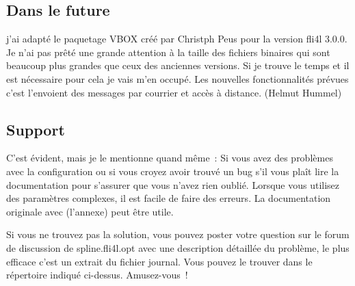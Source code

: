 \subsection{Dans le future}

j'ai adapté le paquetage VBOX créé par Christph Peus pour la version fli4l 3.0.0. Je n'ai pas
prêté une grande attention à la taille des fichiers binaires qui sont beaucoup plus grandes
que ceux des anciennes versions. Si je trouve le temps et il est nécessaire pour cela je vais
m'en occupé. Les nouvelles fonctionnalités prévues c'est l'envoient des messages par courrier
et accès à distance. (Helmut Hummel)

\subsection{Support}

C'est évident, mais je le mentionne quand même~:
Si vous avez des problèmes avec la configuration ou si vous croyez avoir trouvé un bug
s'il vous plaît lire la documentation pour s'assurer que vous n'avez rien oublié. Lorsque
vous utilisez des paramètres complexes, il est facile de faire des erreurs. La documentation
originale avec (l'annexe) peut être utile.

Si vous ne trouvez pas la solution, vous pouvez poster votre question sur le forum de discussion
de spline.fli4l.opt avec une description détaillée du problème, le plus efficace c'est un extrait
du fichier journal. Vous pouvez le trouver dans le répertoire indiqué ci-dessus. Amusez-vous~!

